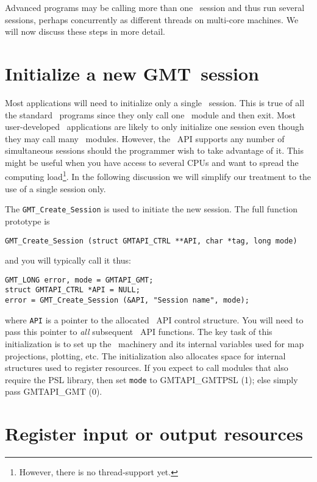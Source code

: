 \documentclass{report}
\begin{document}
Advanced programs may be calling more than one \GMT\ session and thus run several
sessions, perhaps  concurrently as different threads on multi-core machines.
We will now discuss these steps in more detail.

\section{Initialize a new GMT\ session}

Most applications will need to initialize only a single \GMT\ session.  This is true of all
the standard \GMT\ programs since they only call one \GMT\ module and then exit.  Most
user-developed \GMT\ applications are likely to only initialize one session even though
they may call many \GMT\ modules.  However, the \GMT\ API supports any number of
simultaneous sessions should the programmer wish to take advantage of it.  This
might be useful when you have access to several CPUs and want to spread the computing load\footnote{However,
there is no thread-support yet.}.
In the following discussion we will simplify our treatment to the use
of a single session only.

The \texttt{GMT\_Create\_Session} is used to initiate the new session.  The full
function prototype is

\begin{verbatim}
GMT_Create_Session (struct GMTAPI_CTRL **API, char *tag, long mode)
\end{verbatim}
and you will typically call it thus:
\begin{verbatim}
GMT_LONG error, mode = GMTAPI_GMT;
struct GMTAPI_CTRL *API = NULL;
error = GMT_Create_Session (&API, "Session name", mode);
\end{verbatim}
where \texttt{API} is a pointer to the allocated \GMT\ API control structure.  You will need to
pass this pointer to \emph{all} subsequent \GMT\ API functions.  The key task of this initialization
is to set up the \GMT\ machinery and its internal variables used for map projections, plotting,
etc.  The initialization also allocates space for internal structures used to register resources.
If you expect to call modules that also require the PSL library, then set \texttt{mode} to
GMTAPI\_GMTPSL (1); else simply pass GMTAPI\_GMT (0).

\section{Register input or output resources}
\end{document}
